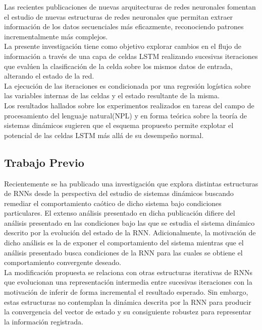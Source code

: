 \documentclass{article}
\begin{document}
	Las recientes publicaciones de nuevas arquitecturas de redes neuronales \cite{1GANs}\cite{18DifferentiableNeuralComputer} fomentan el estudio de nuevas estructuras de redes neuronales que permitan extraer información de los datos secuenciales más eficazmente, reconociendo patrones incrementalmente más complejos.\\
	
	La presente investigación tiene como objetivo explorar cambios en el flujo de información a través de una capa de celdas LSTM realizando sucesivas iteraciones que evalúen la clasificación de la celda sobre los mismos datos de entrada, alterando el estado de la red. \\
	La ejecución de las iteraciones es condicionada por una regresión logística sobre las variables internas de las celdas y el estado resultante de la misma.\\
	Los resultados hallados sobre los experimentos realizados en tareas del campo de procesamiento del lenguaje natural(NPL) y en forma teórica sobre la teoría de sistemas dinámicos sugieren que el esquema propuesto permite explotar el potencial de las celdas LSTM más allá de su desempeño normal.
	
	\subsection{Trabajo Previo}
	Recientemente se ha publicado una investigación\cite{11Laurent} que explora distintas estructuras de RNNs desde la perspectiva del estudio de sistemas dinámicos buscando remediar el comportamiento caótico de dicho sistema bajo condiciones particulares. El extenso análisis presentado en dicha publicación difiere del análisis presentado en las condiciones bajo las que se estudia el sistema dinámico descrito por la evolución del estado de la RNN. Adicionalmente, la motivación de dicho análisis es la de exponer el comportamiento del sistema mientras que el análisis presentado busca condiciones de la RNN para las cuales se obtiene el comportamiento convergente deseado.\\
	
	La modificación propuesta se relaciona con otras estructuras iterativas\cite{2BridgingGaps} de RNNs que evolucionan una representación intermedia entre sucesivas iteraciones con la motivación de inferir de forma incremental el resultado esperado. Sin embargo, estas estructuras no contemplan la dinámica descrita por la RNN para producir la convergencia del vector de estado y su consiguiente robustez para representar la información registrada.\\
	
\end{document}
